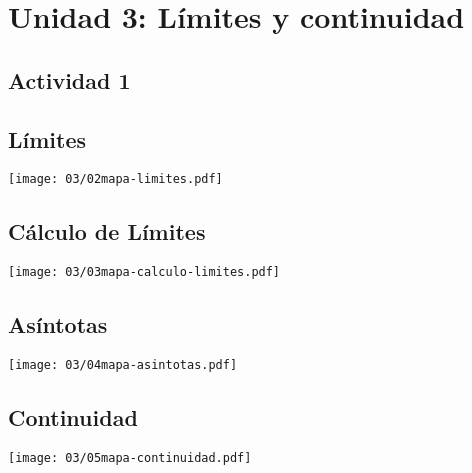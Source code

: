 \section*{Unidad 3: Límites y continuidad}

\subsection*{Actividad 1}
\subsection*{Límites}
\begin{center}
	\texttt{[image: 03/02mapa-limites.pdf]}
\end{center}
\subsection*{Cálculo de Límites}
\begin{center}
	\texttt{[image: 03/03mapa-calculo-limites.pdf]}
\end{center}
\subsection*{Asíntotas}
\begin{center}
	\texttt{[image: 03/04mapa-asintotas.pdf]}
\end{center}
\subsection*{Continuidad}
\begin{center}
	\texttt{[image: 03/05mapa-continuidad.pdf]}
\end{center}